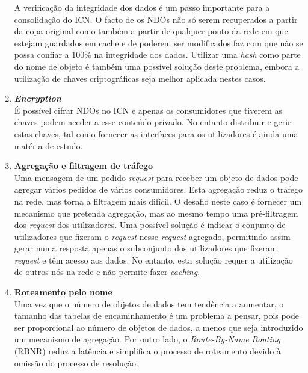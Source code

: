 \documentclass[conference]{IEEEtran}
\begin{document}
\begin{enumerate}
A verifica\c{c}\~{a}o da integridade dos dados \'{e} um passo importante para a consolida\c{c}\~{a}o do ICN. O facto de os NDOs n\~{a}o s\'{o} serem recuperados a partir da copa original como tamb\'{e}m a partir de qualquer ponto da rede em que estejam guardados em cache e de poderem ser modificados faz com que n\~{a}o se possa confiar a 100\% na integridade dos dados. Utilizar uma \textit{hash} como parte do nome de objeto \'{e} tamb\'{e}m uma poss\'{i}vel solu\c{c}\~{a}o deste problema, embora a utiliza\c{c}\~{a}o de chaves criptogr\'{a}ficas seja melhor aplicada nestes casos.\\

\item \textbf{\textit{Encryption}}\\

\'{E} poss\'{i}vel cifrar NDOs no ICN e apenas os consumidores que tiverem as chaves podem aceder a esse conte\'{u}do privado. No entanto distribuir e gerir estas chaves, tal como fornecer as interfaces para os utilizadores \'{e} ainda uma mat\'{e}ria de estudo.\\

\item \textbf{Agrega\c{c}\~{a}o e filtragem de tr\'{a}fego}\\

Uma mensagem de um pedido \textit{request} para receber um objeto de dados pode agregar v\'{a}rios pedidos de v\'{a}rios consumidores. Esta agrega\c{c}\~{a}o reduz o tr\'{a}fego na rede, mas torna a filtragem mais dif\'{i}cil. O desafio neste caso \'{e} fornecer um mecanismo que pretenda agrega\c{c}\~{a}o, mas ao mesmo tempo uma pr\'{e}-filtragem dos \textit{request} dos utilizadores. Uma poss\'{i}vel solu\c{c}\~{a}o \'{e} indicar o conjunto de utilizadores que fizeram o \textit{request} nesse \textit{request} agregado, permitindo assim gerar numa resposta apenas o subconjunto dos utilizadores que fizeram \textit{request} e t\^{e}m acesso aos dados. No entanto, esta solu\c{c}\~{a}o requer a utiliza\c{c}\~{a}o de outros n\'{o}s na rede e n\~{a}o permite fazer \textit{caching}.\\

\item \textbf{Roteamento pelo nome}\\

Uma vez que o n\'{u}mero de objetos de dados tem tend\^{e}ncia a aumentar, o tamanho das tabelas de encaminhamento \'{e} um problema a pensar, pois pode ser proporcional ao n\'{u}mero de objetos de dados, a menos que seja introduzido um mecanismo de agrega\c{c}\~{a}o. Por outro lado, o \textit{Route-By-Name Routing} (RBNR) reduz a lat\^{e}ncia e simplifica o processo de roteamento devido \`{a} omiss\~{a}o do processo de resolu\c{c}\~{a}o.\\
\end{enumerate}
\end{document}
